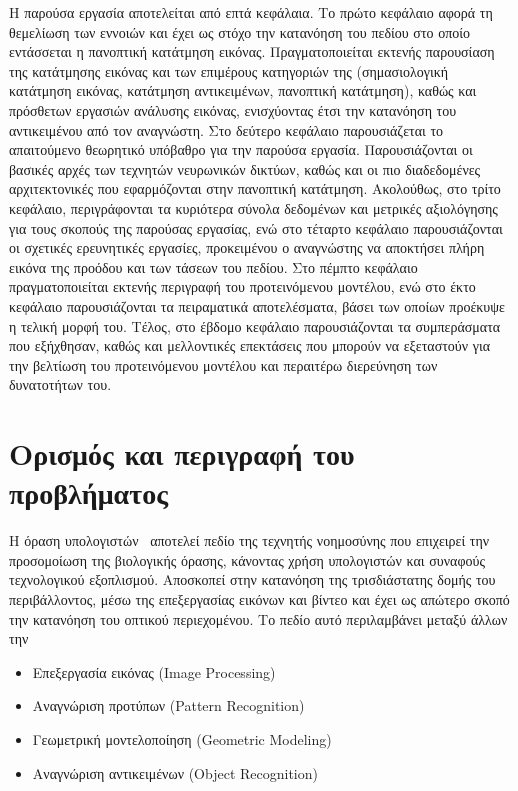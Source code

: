 \documentclass[12pt]{article}
\numberwithin{equation}{section}
\begin{document}
Η παρούσα εργασία αποτελείται από επτά κεφάλαια. Το πρώτο κεφάλαιο αφορά τη θεμελίωση των εννοιών και έχει ως στόχο την κατανόηση του πεδίου στο οποίο εντάσσεται η πανοπτική κατάτμηση εικόνας. Πραγματοποιείται εκτενής παρουσίαση της κατάτμησης εικόνας και των επιμέρους κατηγοριών της (σημασιολογική κατάτμηση εικόνας, κατάτμηση αντικειμένων, πανοπτική κατάτμηση), καθώς και πρόσθετων εργασιών ανάλυσης εικόνας, ενισχύοντας έτσι την κατανόηση του αντικειμένου από τον αναγνώστη. Στο δεύτερο κεφάλαιο παρουσιάζεται το απαιτούμενο θεωρητικό υπόβαθρο για την παρούσα εργασία. Παρουσιάζονται οι βασικές αρχές των τεχνητών νευρωνικών δικτύων, καθώς και οι πιο διαδεδομένες αρχιτεκτονικές που εφαρμόζονται στην πανοπτική κατάτμηση. Ακολούθως, στο τρίτο κεφάλαιο, περιγράφονται τα κυριότερα σύνολα δεδομένων και μετρικές αξιολόγησης για τους σκοπούς της παρούσας εργασίας, ενώ στο τέταρτο κεφάλαιο παρουσιάζονται οι σχετικές ερευνητικές εργασίες, προκειμένου ο αναγνώστης να αποκτήσει πλήρη εικόνα της προόδου και των τάσεων του πεδίου. Στο πέμπτο κεφάλαιο πραγματοποιείται εκτενής περιγραφή του προτεινόμενου μοντέλου, ενώ στο έκτο κεφάλαιο παρουσιάζονται τα πειραματικά αποτελέσματα, βάσει των οποίων προέκυψε η τελική μορφή του. Τέλος, στο έβδομο κεφάλαιο παρουσιάζονται τα συμπεράσματα που εξήχθησαν, καθώς και μελλοντικές επεκτάσεις που μπορούν να εξεταστούν για την βελτίωση του προτεινόμενου μοντέλου και περαιτέρω διερεύνηση των δυνατοτήτων του.

\newpage
\mbox{}
\newpage

\section{Ορισμός και περιγραφή του προβλήματος}

Η όραση υπολογιστών~\cite{Gao_2020} αποτελεί πεδίο της τεχνητής νοημοσύνης που επιχειρεί την προσομοίωση της βιολογικής όρασης, κάνοντας χρήση υπολογιστών και συναφούς τεχνολογικού εξοπλισμού. Αποσκοπεί στην κατανόηση της τρισδιάστατης δομής του περιβάλλοντος, μέσω της επεξεργασίας εικόνων και βίντεο και έχει ως απώτερο σκοπό την κατανόηση του οπτικού περιεχομένου. Το πεδίο αυτό περιλαμβάνει μεταξύ άλλων την

\begin{itemize}
    \item Επεξεργασία εικόνας (Image Processing)
    \item Αναγνώριση προτύπων (Pattern Recognition)
    \item Γεωμετρική μοντελοποίηση (Geometric Μodeling)
    \item Αναγνώριση αντικειμένων (Object Recognition)
\end{itemize}
\end{document}
